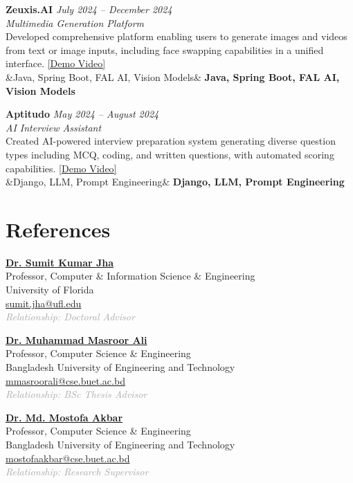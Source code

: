\documentclass[a4paper,9pt]{article}
\newcommand{\cvproject}[5]{%
    \textbf{#1} \hfill \textit{#2}\\
    \textit{#3}\\
    \vspace{0pt}
    #4\\
    \ifx&#5&%
    \else
        \vspace{0pt}
        \textbf{#5}
        \vspace{1pt}
    \fi
}
\newcommand{\cvreference}[6]{%
    \textbf{\href{#5}{#1}}\\
    #2\\
    #3\\
    \href{mailto:#4}{#4}\\
    \textcolor{darkgray}{\textit{#6}}\\
    \vspace{0pt}
}
\begin{document}
\cvproject
{Zeuxis.AI}
{July 2024 -- December 2024}
{Multimedia Generation Platform}
{Developed comprehensive platform enabling users to generate images and videos from text or image inputs, including face swapping capabilities in a unified interface. \href{https://drive.google.com/file/d/11QxG8HJvnvxxjeJUOkFmE90teG4dbDRw/view?usp=sharing}{\textcolor{primaryblue}{[Demo Video]}}}
{Java, Spring Boot, FAL AI, Vision Models}

\cvproject
{Aptitudo}
{May 2024 -- August 2024}
{AI Interview Assistant}
{Created AI-powered interview preparation system generating diverse question types including MCQ, coding, and written questions, with automated scoring capabilities. \href{https://drive.google.com/file/d/1wSSblaQzrzr2OAD52C-nwiFe4zyxj6Gq/view?usp=sharing}{\textcolor{primaryblue}{[Demo Video]}}}
{Django, LLM, Prompt Engineering}

\section{References}

\begin{minipage}[t]{0.31\textwidth}
    \cvreference
    {Dr. Sumit Kumar Jha}
    {Professor, Computer \& Information Science \& Engineering}
    {University of Florida}
    {sumit.jha@ufl.edu}
    {https://sumitkumarjha.com/}
    {Relationship: Doctoral Advisor}
\end{minipage}
\hfill
\begin{minipage}[t]{0.31\textwidth}
    \cvreference
    {Dr. Muhammad Masroor Ali}
    {Professor, Computer Science \& Engineering}
    {Bangladesh University of Engineering and Technology}
    {mmasroorali@cse.buet.ac.bd}
    {https://cse.buet.ac.bd/faculty/faculty_detail/mmasroorali}
    {Relationship: BSc Thesis Advisor}
\end{minipage}
\hfill
\begin{minipage}[t]{0.31\textwidth}
    \cvreference
    {Dr. Md. Mostofa Akbar}
    {Professor, Computer Science \& Engineering}
    {Bangladesh University of Engineering and Technology}
    {mostofaakbar@cse.buet.ac.bd}
    {https://cse.buet.ac.bd/faculty/faculty_detail/mostofa}
    {Relationship: Research Supervisor}
\end{minipage}
\end{document}
